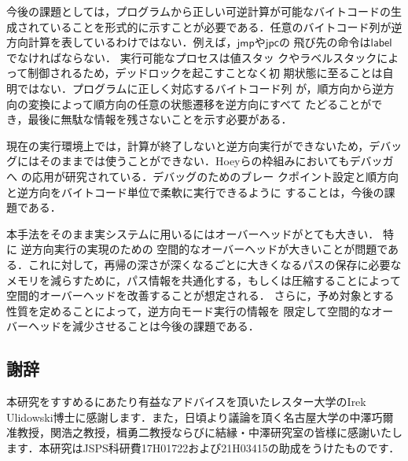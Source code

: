 \documentclass[submit,PRO]{ipsj}
\newcommand{\bcode}[1]{$\mathsf{#1}$}
\begin{document}
今後の課題としては，プログラムから正しい可逆計算が可能なバイトコードの生
成されていることを形式的に示すことが必要である．任意のバイトコード列が逆
方向計算を表しているわけではない．例えば，\bcode{jmp}や\bcode{jpc}の
飛び先の命令は\bcode{label}でなければならない．
実行可能なプロセスは値スタッ
クやラベルスタックによって制御されるため，デッドロックを起こすことなく初
期状態に至ることは自明ではない．プログラムに正しく対応するバイトコード列
が，順方向から逆方向の変換によって順方向の任意の状態遷移を逆方向にすべて
たどることができ，最後に無駄な情報を残さないことを示す必要がある．

現在の実行環境上では，計算が終了しないと逆方向実行ができないため，デバッ
グにはそのままでは使うことができない．Hoeyらの枠組みにおいてもデバッガへ
の応用が研究されている\cite{DBLP:conf/rc/HoeyU19}．デバッグのためのブレー
クポイント設定と順方向と逆方向をバイトコード単位で柔軟に実行できるように
することは，今後の課題である．

本手法をそのまま実システムに用いるにはオーバーヘッドがとても大きい．
特に%
逆方向実行の実現のための%
空間的なオーバーヘッドが大きいことが問題である．これに対して，再帰の深さが深くなるごとに大きくなるパスの保存に必要なメモリを減らすために，パス情報を共通化する，もしくは圧縮することによって空間的オーバーヘッドを改善することが想定される．
さらに，予め対象とする性質を定めることによって，逆方向モード実行の情報を
限定して空間的なオーバーヘッドを減少させることは今後の課題である．

\subsection*{謝辞}

本研究をすすめるにあたり有益なアドバイスを頂いたレスター大学のIrek
Ulidowski博士に感謝します．また，日頃より議論を頂く名古屋大学の中澤巧爾
准教授，関浩之教授，楫勇二教授ならびに結縁・中澤研究室の皆様に感謝いたし
ます．本研究はJSPS科研費17H01722および21H03415の助成をうけたものです．




\begin{biography}
\end{biography}
\end{document}
